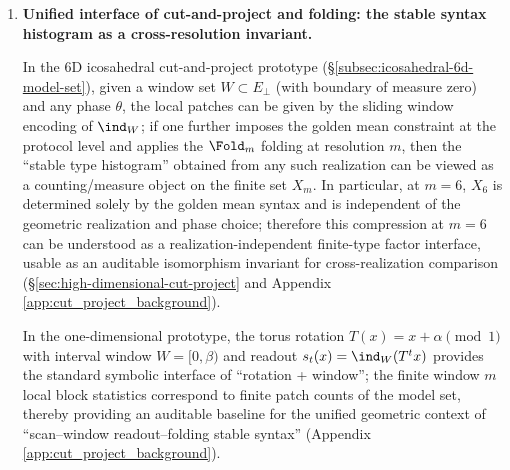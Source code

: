 \begin{enumerate}
  \begin{corollary}\label{cor:terminal-foldbin-finite-saturation}
  If saturation occurs at some \(m\), then \(2^m\) and \(F_{K(m)+2}\) are anomalously close, satisfying the exponentially small logarithmic linear form constraint
  \[
  \Bigl|(K(m)+2)\log\varphi-m\log 2-\log\sqrt5\Bigr|
  \ \lesssim\ \Bigl(\frac{\varphi}{2}\Bigr)^m.
  \]
  Combined with Baker--W\"ustholz/Matveev-type lower bounds, this implies that saturation can occur only finitely many times (Remark \ref{rem:fold-bin-finite}; see also the reproducible audit output in Table \ref{tab:fold_binary_saturation_points}).
  \end{corollary}

  \item \textbf{Unified interface of cut-and-project and folding: the stable syntax histogram as a cross-resolution invariant.}

  \begin{proposition}[Interface from cut-and-project \texorpdfstring{$\Rightarrow$}{=>} folding histogram invariant]
  \label{prop:terminal-cut-project-to-fold-hist}
  In the 6D icosahedral cut-and-project prototype (\S\ref{subsec:icosahedral-6d-model-set}), given a window set \(W\subset E_\perp\) (with boundary of measure zero) and any phase \(\theta\), the local patches can be given by the sliding window encoding of \(\ind_W\); if one further imposes the golden mean constraint at the protocol level and applies the \(\Fold_m\) folding at resolution \(m\), then the ``stable type histogram'' obtained from any such realization can be viewed as a counting/measure object on the finite set \(X_m\). In particular, at \(m=6\), \(X_6\) is determined solely by the golden mean syntax and is independent of the geometric realization and phase choice; therefore this compression at \(m=6\) can be understood as a realization-independent finite-type factor interface, usable as an auditable isomorphism invariant for cross-realization comparison (\S\ref{sec:high-dimensional-cut-project} and Appendix \ref{app:cut_project_background}).
  \end{proposition}

  \begin{corollary}
  \label{cor:terminal-rotation-window-prototype}
  In the one-dimensional prototype, the torus rotation \(T(x)=x+\alpha\pmod 1\) with interval window \(W=[0,\beta)\) and readout \(s_t(x)=\ind_W(T^t x)\) provides the standard symbolic interface of ``rotation + window''; the finite window \(m\) local block statistics correspond to finite patch counts of the model set, thereby providing an auditable baseline for the unified geometric context of ``scan--window readout--folding stable syntax'' (Appendix \ref{app:cut_project_background}).
  \end{corollary}


\end{enumerate}
